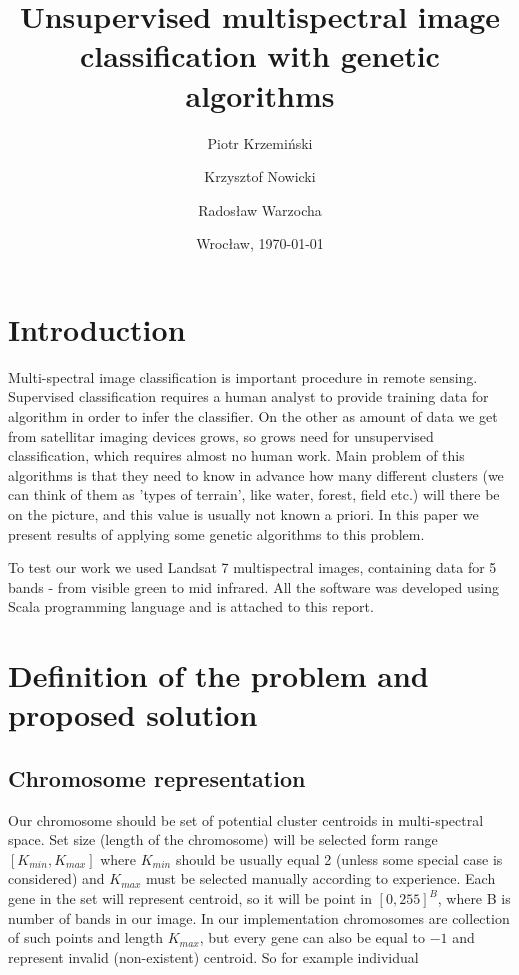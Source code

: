 \documentclass[11pt,leqno]{article}
\title{{\textbf{Unsupervised multispectral image classification with genetic algorithms}}}
\author{Piotr Krzemiński \and Krzysztof Nowicki \and Radosław Warzocha}
\date{Wrocław, \today}
\theoremstyle{mytheoremstyle}
\theoremstyle{mytheoremstyle}
\begin{document}
\maketitle
\thispagestyle{empty}

\section{Introduction}

Multi-spectral image classification is important procedure in remote sensing. Supervised classification requires a human analyst to provide training data for algorithm in order to infer the classifier. On the other as amount of data we get from satellitar imaging devices grows, so grows need for unsupervised classification, which requires almost no human work. Main problem of this algorithms is that they need to know in advance how many different clusters (we can think of them as 'types of terrain', like water, forest, field etc.) will there be on the picture, and this value is usually not known a priori. In this paper we present results of applying some genetic algorithms to this problem.

To test our work we used Landsat 7 multispectral images, containing data for 5  bands - from visible green to mid infrared. All the software was developed using Scala programming language and is attached to this report.

\section{Definition of the problem and proposed solution}

\subsection{Chromosome representation}

Our chromosome should be set of potential cluster centroids in multi-spectral space. Set size (length of the chromosome) will be selected form range $[K_{min}, K_{max}]$ where $K_{min}$ should be usually equal 2 (unless some special case is considered) and $K_{max}$ must be selected manually according to experience. Each gene in the set will represent centroid, so it will be point in $[0,255]^B$, where B is number of bands in our image. In our implementation chromosomes are collection of such points and length $K_{max}$, but every gene can also be equal to $-1$ and represent invalid (non-existent) centroid. So for example individual
\end{document}
